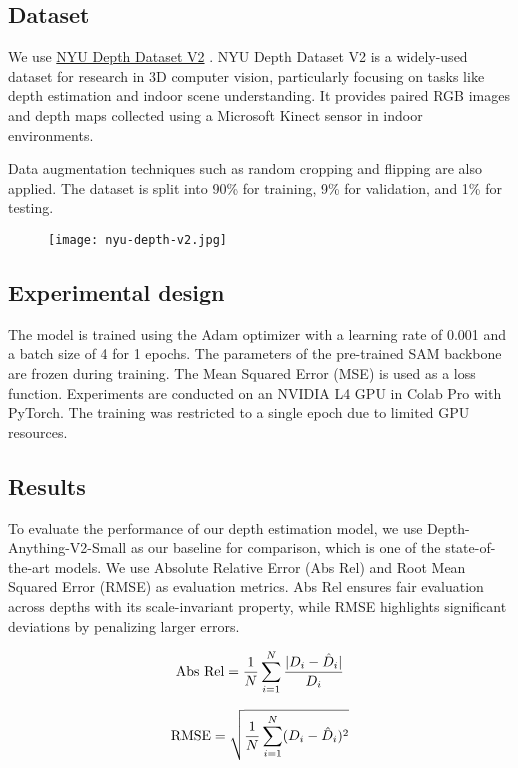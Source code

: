 \documentclass{article}
\begin{document}
\subsection{Dataset}

We use \href{https://cs.nyu.edu/~fergus/datasets/nyu_depth_v2.html}{NYU Depth Dataset V2} \cite{NYU-Depth-V2-Dataset}. NYU Depth Dataset V2 is a widely-used dataset for research in 3D computer vision, particularly focusing on tasks like depth estimation and indoor scene understanding. It provides paired RGB images and depth maps collected using a Microsoft Kinect sensor in indoor environments.

Data augmentation techniques such as random cropping and flipping are also applied. The dataset is split into 90\% for training, 9\% for validation, and 1\% for testing.

\begin{figure}[ht]
\centering
\texttt{[image: nyu-depth-v2.jpg]}
\label{fig:nyu-depth-v2}
\end{figure}

\subsection{Experimental design}

The model is trained using the Adam optimizer with a learning rate of 0.001 and a batch size of 4 for 1 epochs. The parameters of the pre-trained SAM backbone are frozen during training. The Mean Squared Error (MSE) is used as a loss function. Experiments are conducted on an NVIDIA L4 GPU in Colab Pro with PyTorch. The training was restricted to a single epoch due to limited GPU resources. 

\subsection{Results}

To evaluate the performance of our depth estimation model, we use Depth-Anything-V2-Small as our baseline for comparison, which is one of the state-of-the-art models. We use Absolute Relative Error (Abs Rel) and Root Mean Squared Error (RMSE) as evaluation metrics. Abs Rel ensures fair evaluation across depths with its scale-invariant property, while RMSE highlights significant deviations by penalizing larger errors.

{\small

\begin{equation}
    \textnormal{Abs Rel} = \frac{1}{N} \sum_{i=1}^{N} \frac{|D_i - \hat{D}_i|}{D_i}
\end{equation}

\begin{equation}
    \textnormal{RMSE} = \sqrt{\frac{1}{N} \sum_{i=1}^{N} (D_i - \hat{D}_i)^2}
\end{equation}

}
\end{document}
